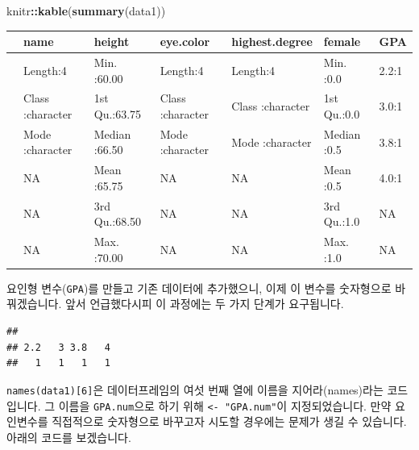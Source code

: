 \documentclass[]{book}
\newenvironment{Shaded}{\begin{snugshade}}{\end{snugshade}}
\newcommand{\CommentTok}[1]{\textcolor[rgb]{0.56,0.35,0.01}{\textit{#1}}}
\newcommand{\DecValTok}[1]{\textcolor[rgb]{0.00,0.00,0.81}{#1}}
\newcommand{\KeywordTok}[1]{\textcolor[rgb]{0.13,0.29,0.53}{\textbf{#1}}}
\newcommand{\NormalTok}[1]{#1}
\newcommand{\OperatorTok}[1]{\textcolor[rgb]{0.81,0.36,0.00}{\textbf{#1}}}
\newcommand{\StringTok}[1]{\textcolor[rgb]{0.31,0.60,0.02}{#1}}
\begin{document}
\begin{Shaded}
\begin{Highlighting}[]
\NormalTok{knitr}\OperatorTok{::}\KeywordTok{kable}\NormalTok{(}\KeywordTok{summary}\NormalTok{(data1))}
\end{Highlighting}
\end{Shaded}

\begin{tabular}{l|l|l|l|l|l|l}
\hline
  &     name &     height &  eye.color & highest.degree &     female &  GPA\\
\hline
 & Length:4 & Min.   :60.00 & Length:4 & Length:4 & Min.   :0.0 & 2.2:1\\
\hline
 & Class :character & 1st Qu.:63.75 & Class :character & Class :character & 1st Qu.:0.0 & 3.0:1\\
\hline
 & Mode  :character & Median :66.50 & Mode  :character & Mode  :character & Median :0.5 & 3.8:1\\
\hline
 & NA & Mean   :65.75 & NA & NA & Mean   :0.5 & 4.0:1\\
\hline
 & NA & 3rd Qu.:68.50 & NA & NA & 3rd Qu.:1.0 & NA\\
\hline
 & NA & Max.   :70.00 & NA & NA & Max.   :1.0 & NA\\
\hline
\end{tabular}

요인형 변수(\texttt{GPA})를 만들고 기존 데이터에 추가했으니, 이제 이 변수를 숫자형으로 바꿔겠습니다. 앞서 언급했다시피 이 과정에는 두 가지 단계가 요구됩니다.

\begin{Shaded}
\end{Shaded}

\begin{verbatim}
## 
## 2.2   3 3.8   4 
##   1   1   1   1
\end{verbatim}

\texttt{names(data1){[}6{]}}은 데이터프레임의 여섯 번째 열에 이름을 지어라(names)라는 코드입니다. 그 이름을 \texttt{GPA.num}으로 하기 위해 \texttt{\textless{}-\ "GPA.num"}이 지정되었습니다. 만약 요인변수를 직접적으로 숫자형으로 바꾸고자 시도할 경우에는 문제가 생길 수 있습니다. 아래의 코드를 보겠습니다.
\end{document}
